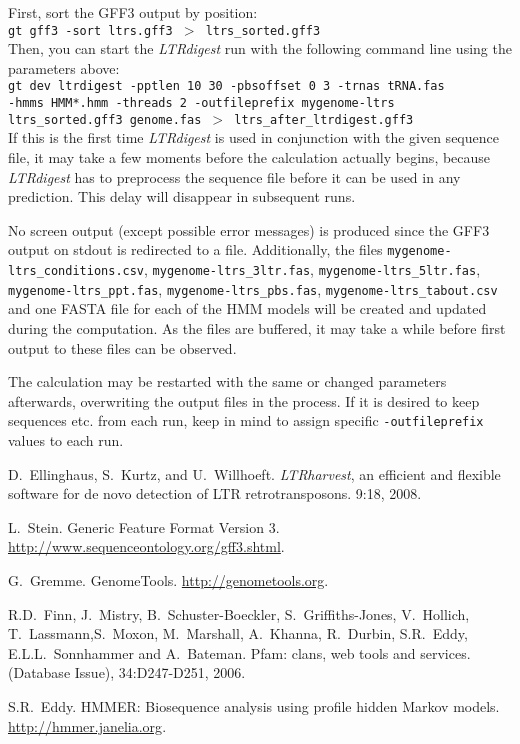 \documentclass[12pt,titlepage]{article}
\newcommand{\LTRdigest}{\textit{LTRdigest}\xspace}
\newcommand{\GtLTRdigest}{\texttt{gt dev ltrdigest}\xspace}
\begin{document}
First, sort the GFF3 output by position:
\\[0.5cm]
\texttt{gt gff3 -sort ltrs.gff3 $>$ ltrs\_sorted.gff3}
\\[0.5cm]
Then, you can start the \LTRdigest run with the following command line using the parameters above:
\\[0.5cm]
\texttt{\GtLTRdigest\ -pptlen 10 30 -pbsoffset 0 3 -trnas tRNA.fas \\-hmms HMM*.hmm -threads 2 -outfileprefix mygenome-ltrs ltrs\_sorted.gff3 genome.fas $>$ ltrs\_after\_ltrdigest.gff3}
\\[0.5cm]
If this is the first time \LTRdigest is used in conjunction with the given sequence file, it may take a few moments before the calculation actually begins, because \LTRdigest has to preprocess the sequence file before it can be used in any prediction. This delay will disappear in subsequent runs.

No screen output (except possible error messages) is produced since the GFF3 output on stdout is redirected to a file. Additionally, the files \texttt{mygenome\--ltrs\_conditions.csv}, \texttt{mygenome\--ltrs\_3ltr.fas}, \texttt{mygenome\--ltrs\_5ltr.fas}, \texttt{mygenome\--ltrs\_ppt.fas}, \texttt{mygenome\--ltrs\_pbs.fas}, \texttt{mygenome-\-ltrs\_tabout.csv} and one FASTA file for each of the HMM models will be created and updated during the computation. As the files are buffered, it may take a while before first output to these files can be observed.

The calculation may be restarted with the same or changed parameters afterwards, overwriting the output files in the process. If it is desired to keep sequences etc. from each run, keep in mind to assign specific \texttt{-outfileprefix} values to each run.


\begin{thebibliography}{1}

D.~Ellinghaus, S.~Kurtz, and U.~Willhoeft.
\newblock \emph{LTRharvest}, an efficient and flexible software for de novo
  detection of \normalsize{LTR} retrotransposons.
 9:18, 2008.

L.~Stein.
\newblock Generic Feature Format Version 3.
  \url{http://www.sequenceontology.org/gff3.shtml}.

G.~Gremme.
\newblock GenomeTools.
  \url{http://genometools.org}.

R.D.~Finn, J.~Mistry, B.~Schuster-Boeckler, S.~Griffiths-Jones, V.~Hollich, T.~Lassmann,S.~Moxon, M.~Marshall, A.~Khanna, R.~Durbin, S.R.~Eddy, E.L.L.~Sonnhammer and A.~Bateman.
\newblock  Pfam: clans, web tools and services.
 (Database Issue), 34:D247-D251, 2006.

S.R.~Eddy.
\newblock HMMER: Biosequence analysis using profile hidden Markov models.
  \url{http://hmmer.janelia.org}.


\end{thebibliography}
\end{document}
